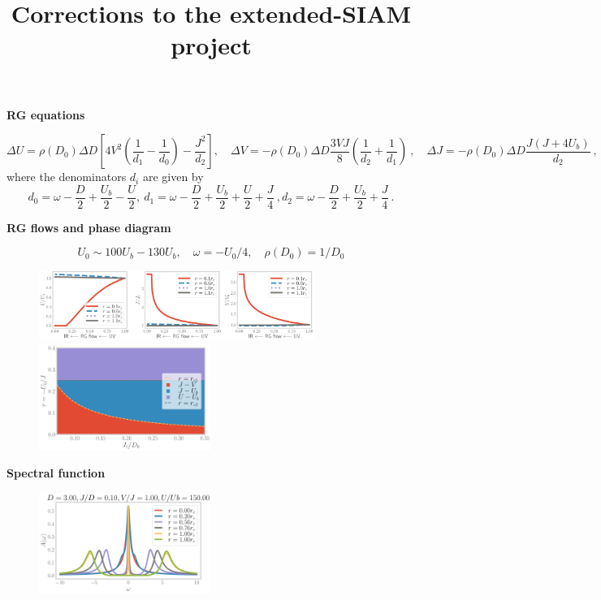 \documentclass{revtex4-2}
\begin{document}
\title{Corrections to the extended-SIAM project}
\maketitle

{\bf RG equations}\par\noindent
\[\Delta U = \rho(D_0)\Delta D \left[4V^2 \left(\frac{1}{d_1} - \frac{1}{d_0}\right) - \frac{J^2}{d_2}\right] ,\quad \Delta V = -\rho(D_0)\Delta D \frac{3 V J}{8}\left(\frac{1}{d_2} + \frac{1}{d_1}\right)~,\quad \Delta J = -\rho(D_0)\Delta D \frac{ J\left(J + 4U_b\right)}{d_2}~,\]
where the denominators \(d_i\) are given by
\[d_0 = \omega - \frac{D}{2} + \frac{U_b}{2} - \frac{U}{2},~d_1 = \omega - \frac{D}{2} + \frac{U_b}{2} + \frac{U}{2} + \frac{J}{4}~, d_2 = \omega - \frac{D}{2} + \frac{U_b}{2} + \frac{J}{4}~.\]

{\bf RG flows and phase diagram}\par\noindent
\[U_0 \sim 100U_b - 130U_b,\quad \omega = -U_0/4, \quad \rho(D_0) = 1/D_0\]
\begin{figure}[htpb]
\centering
\includegraphics[width=0.8\textwidth]{rg-flows-all.pdf}
\includegraphics[width=0.5\textwidth]{phase-map-MIT.pdf}
\end{figure}

{\bf Spectral function}\par\noindent
\begin{figure}[htpb]
	\centering
	\includegraphics[width=0.5\textwidth]{spectral-function-D=3.00_J_by_D=0.10_V_by_J=1.00_U_by_Ub=150.00.pdf}
\end{figure}
\end{document}
